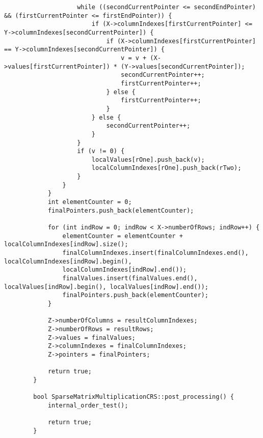 \documentclass[a4paper, 14pt]{article}
\begin{document}
\begin{verbatim}
					while ((secondCurrentPointer <= secondEndPointer) && (firstCurrentPointer <= firstEndPointer)) {
						if (X->columnIndexes[firstCurrentPointer] <= Y->columnIndexes[secondCurrentPointer]) {
							if (X->columnIndexes[firstCurrentPointer] == Y->columnIndexes[secondCurrentPointer]) {
								v = v + (X->values[firstCurrentPointer]) * (Y->values[secondCurrentPointer]);
								secondCurrentPointer++;
								firstCurrentPointer++;
							} else {
								firstCurrentPointer++;
							}
						} else {
							secondCurrentPointer++;
						}
					}
					if (v != 0) {
						localValues[rOne].push_back(v);
						localColumnIndexes[rOne].push_back(rTwo);
					}
				}
			}
			int elementCounter = 0;
			finalPointers.push_back(elementCounter);
			
			for (int indRow = 0; indRow < X->numberOfRows; indRow++) {
				elementCounter = elementCounter + localColumnIndexes[indRow].size();
				finalColumnIndexes.insert(finalColumnIndexes.end(), localColumnIndexes[indRow].begin(),
				localColumnIndexes[indRow].end());
				finalValues.insert(finalValues.end(), localValues[indRow].begin(), localValues[indRow].end());
				finalPointers.push_back(elementCounter);
			}
			
			Z->numberOfColumns = resultColumnIndexes;
			Z->numberOfRows = resultRows;
			Z->values = finalValues;
			Z->columnIndexes = finalColumnIndexes;
			Z->pointers = finalPointers;
			
			return true;
		}
		
		bool SparseMatrixMultiplicationCRS::post_processing() {
			internal_order_test();
			
			return true;
		}
	\end{verbatim}
	
\end{document}
